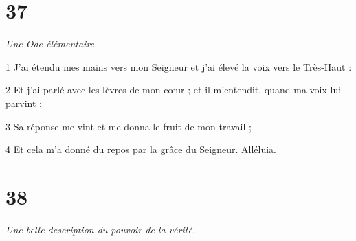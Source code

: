\chapter{37}

\par \textit{Une Ode élémentaire.}

\par 1 J'ai étendu mes mains vers mon Seigneur et j'ai élevé la voix vers le Très-Haut :
\par 2 Et j'ai parlé avec les lèvres de mon cœur ; et il m'entendit, quand ma voix lui parvint :
\par 3 Sa réponse me vint et me donna le fruit de mon travail ;
\par 4 Et cela m'a donné du repos par la grâce du Seigneur. Alléluia.



\chapter{38}

\par \textit{Une belle description du pouvoir de la vérité.}

